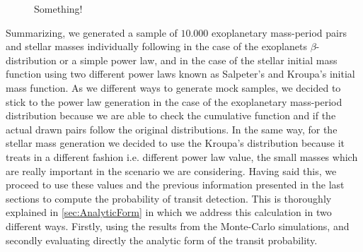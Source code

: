 \begin{figure}[!ht]
\centering
\caption{\scriptsize{Something!}}
\label{fig:Kroupa_IMF}
\end{figure}

Summarizing, we generated a sample of $10.000$ exoplanetary mass-period pairs and stellar masses individually following in the case of the exoplanets $\beta$-distribution or a simple power law, and in the case of the stellar initial mass function using two different power laws known as Salpeter's and Kroupa's initial mass function. As we different ways to generate mock samples, we decided to stick to the power law generation in the case of the exoplanetary mass-period distribution because we are able to check the cumulative function and if the actual drawn pairs follow the original distributions. In the same way, for the stellar mass generation we decided to use the Kroupa's distribution because it treats in a different fashion i.e. different power law value, the small masses which are really important in the scenario we are considering. Having said this, we proceed to use these values and the previous information presented in the last sections to compute the probability of transit detection. This is thoroughly explained in \autoref{sec:AnalyticForm} in which we address this calculation in two different ways. Firstly, using the results from the Monte-Carlo simulations, and secondly evaluating directly the analytic form of the transit probability.     


